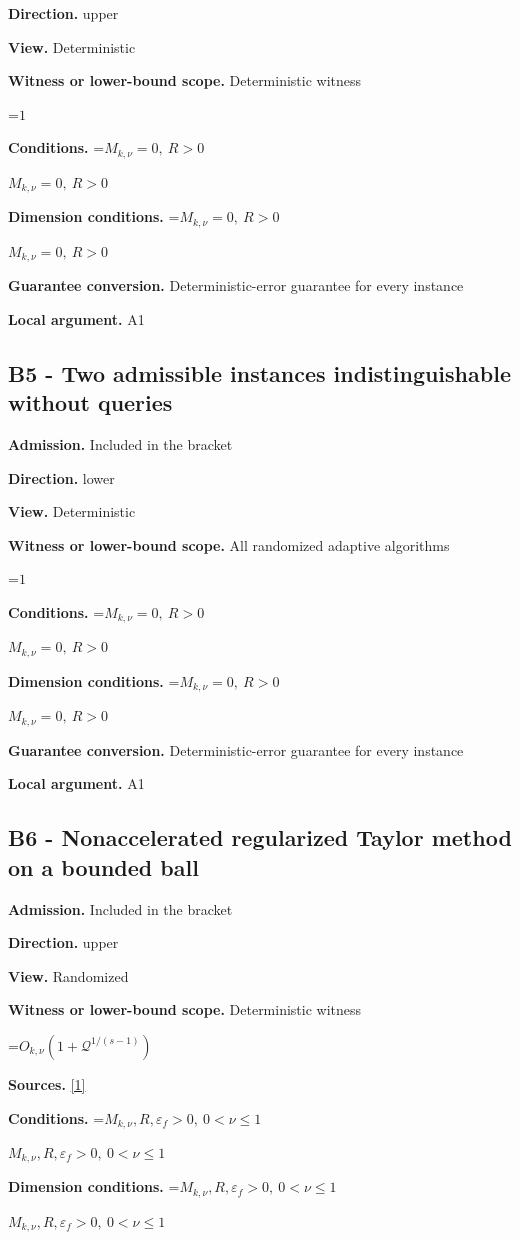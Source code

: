 \documentclass[10pt,a4paper]{article}
\newcommand{\AtlasMath}[1]{\par\begingroup\centering\setbox0=\hbox{$\displaystyle #1$}\ifdim\wd0>1.4\linewidth\typeout{ATLAS WIDE FORMULA: \the\wd0}\fi\ifdim\wd0>\linewidth\resizebox{\linewidth}{!}{\box0}\else\box0\fi\par\endgroup}
\newcommand{\AtlasInlineMath}[1]{\begingroup\setbox0=\hbox{$#1$}\ifdim\wd0>.4\linewidth\endgroup\AtlasMath{#1}\else\endgroup$#1$\fi}
\begin{document}
\textbf{Direction.} upper

\textbf{View.} Deterministic

\textbf{Witness or lower-bound scope.} Deterministic witness

\AtlasMath{1}
\textbf{Conditions.} \AtlasInlineMath{M_{k,\nu}=0,\ R>0}

\textbf{Dimension conditions.} \AtlasInlineMath{M_{k,\nu}=0,\ R>0}

\textbf{Guarantee conversion.} Deterministic-error guarantee for every instance

\textbf{Local argument.} A1

\subsection{B5 - Two admissible instances indistinguishable without queries}
\textbf{Admission.} Included in the bracket

\textbf{Direction.} lower

\textbf{View.} Deterministic

\textbf{Witness or lower-bound scope.} All randomized adaptive algorithms

\AtlasMath{1}
\textbf{Conditions.} \AtlasInlineMath{M_{k,\nu}=0,\ R>0}

\textbf{Dimension conditions.} \AtlasInlineMath{M_{k,\nu}=0,\ R>0}

\textbf{Guarantee conversion.} Deterministic-error guarantee for every instance

\textbf{Local argument.} A1

\subsection{B6 - Nonaccelerated regularized Taylor method on a bounded ball}
\textbf{Admission.} Included in the bracket

\textbf{Direction.} upper

\textbf{View.} Randomized

\textbf{Witness or lower-bound scope.} Deterministic witness

\AtlasMath{O_{k,\nu}(1+\mathcal{Q}^{1/(s-1)})}
\textbf{Sources.} \href{https://arxiv.org/pdf/2411.08987v2}{[1]}

\textbf{Conditions.} \AtlasInlineMath{M_{k,\nu},R,\varepsilon_f>0,\ 0<\nu\le1}

\textbf{Dimension conditions.} \AtlasInlineMath{M_{k,\nu},R,\varepsilon_f>0,\ 0<\nu\le1}
\end{document}
